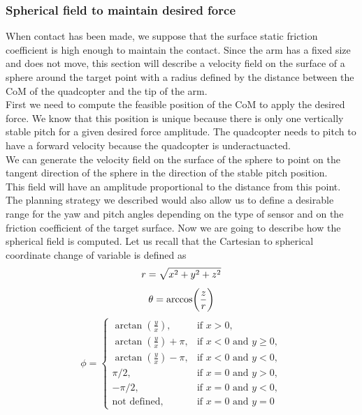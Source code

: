 \subsubsection{Spherical field to maintain desired force}
When contact has been made, we suppose that the surface static friction coefficient is high enough to maintain the contact.
Since the arm has a fixed size and does not move, this section will describe a velocity field on the surface of a sphere around the target point with a radius defined by the distance between the CoM of the quadcopter and the tip of the arm.\\
First we need to compute the feasible position of the CoM to apply the desired force. 
We know that this position is unique because there is only one vertically stable pitch for a given desired force amplitude. The quadcopter needs to pitch to have a forward velocity because the quadcopter is underactuacted.\\
We can generate the velocity field on the surface of the sphere to point on the tangent direction of the sphere in the direction of the stable pitch position. \\
This field will have an amplitude proportional to the distance from this point.
The planning strategy we described would also allow us to define a desirable range for the yaw and pitch angles depending on the type of sensor and on the friction coefficient of the target surface.
Now we are going to describe how the spherical field is computed. 
Let us recall that the Cartesian to spherical coordinate change of variable is defined as
\begin{equation} 
    r = \sqrt{x^2+y^2+z^2}\\ \nonumber 
\end{equation}
\begin{equation}
    \theta = \arccos(\frac{z}{r})\\\nonumber 
\end{equation}
\begin{equation}
    \label{transformation}
    \phi =
    \begin{cases}
        \arctan(\frac{y}{x}), & \text{if $x>0$},\\
        \arctan(\frac{y}{x}) + \pi, & \text{if $x<0$ and $y\geq 0$},\\
        \arctan(\frac{y}{x}) - \pi, & \text{if $x<0$ and $y<0$},\\
        \pi/2, & \text{if $x=0$ and $y>0$},\\
        -\pi/2, & \text{if $x=0$ and $y<0$},\\
        \text{not defined} , & \text{if $x=0$ and $y=0$}
    \end{cases}       
\end{equation}  
